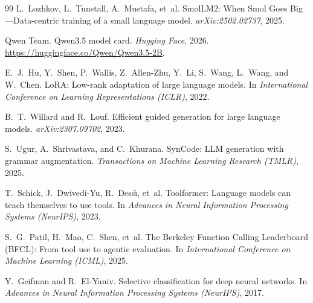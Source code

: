 \documentclass[12pt]{article}
\begin{document}
\begin{thebibliography}{99}
L.~Lozhkov, L.~Tunstall, A.~Mustafa, et~al.
\newblock SmolLM2: When Smol Goes Big---Data-centric training of a small language model.
\newblock \textit{arXiv:2502.02737}, 2025.

Qwen Team.
\newblock Qwen3.5 model card.
\newblock \textit{Hugging Face}, 2026. \url{https://huggingface.co/Qwen/Qwen3.5-2B}.

E.~J.~Hu, Y.~Shen, P.~Wallis, Z.~Allen-Zhu, Y.~Li, S.~Wang, L.~Wang, and W.~Chen.
\newblock LoRA: Low-rank adaptation of large language models.
\newblock In \textit{International Conference on Learning Representations (ICLR)}, 2022.

B.~T.~Willard and R.~Louf.
\newblock Efficient guided generation for large language models.
\newblock \textit{arXiv:2307.09702}, 2023.

S.~Ugur, A.~Shrivastava, and C.~Khurana.
\newblock SynCode: LLM generation with grammar augmentation.
\newblock \textit{Transactions on Machine Learning Research (TMLR)}, 2025.

T.~Schick, J.~Dwivedi-Yu, R.~Dess{\`\i}, et~al.
\newblock Toolformer: Language models can teach themselves to use tools.
\newblock In \textit{Advances in Neural Information Processing Systems (NeurIPS)}, 2023.

S.~G.~Patil, H.~Mao, C.~Shen, et~al.
\newblock The Berkeley Function Calling Leaderboard (BFCL): From tool use to agentic evaluation.
\newblock In \textit{International Conference on Machine Learning (ICML)}, 2025.

Y.~Geifman and R.~El-Yaniv.
\newblock Selective classification for deep neural networks.
\newblock In \textit{Advances in Neural Information Processing Systems (NeurIPS)}, 2017.

\end{thebibliography}
\end{document}
